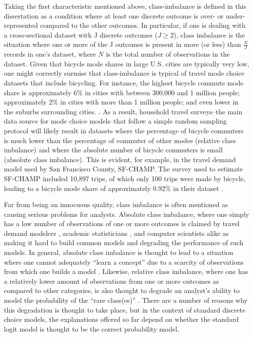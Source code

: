 Taking the first characteristic mentioned above, class-imbalance is defined in this dissertation as a condition where at least one discrete outcome is over- or under-represented compared to the other outcomes. In particular, if one is dealing with a cross-sectional dataset with J discrete outcomes ($J \geq 2$), class imbalance is the situation where one or more of the J outcomes is present in more (or less) than $\frac{N}{J}$  records in one's dataset, where $N$ is the total number of observations in the dataset. Given that bicycle mode shares in large U.S. cities are typically very low, one might correctly surmise that class-imbalance is typical of travel mode choice datasets that include bicycling. For instance, the highest bicycle commute mode share is approximately 6\% in cities with between 300,000 and 1 million people; approximately 2\% in cities with more than 1 million people; and even lower in the suburbs surrounding cities. \citep{league_of_american_bicyclists_where_2014}. As a result, household travel surveys--the main data source for mode choice models--that follow a simple random sampling protocol will likely result in datasets where the percentage of bicycle commuters is much lower than the percentage of commuter of other modes (relative class imbalance) and where the absolute number of bicycle commuters is small (absolute class imbalance). This is evident, for example, in the travel demand model used by San Francisco County, SF-CHAMP. The survey used to estimate SF-CHAMP included 10,897 trips, of which only 100 trips were made by bicycle, leading to a bicycle mode share of approximately 0.92\% in their dataset \citep{cambridge_systematics_san_2002}.

Far from being an innocuous quality, class imbalance is often mentioned as causing serious problems for analysts. Absolute class imbalance, where one simply has a low number of observations of one or more outcomes is claimed by travel demand modelers \citep{parsons_brinckerhoff_quade_&_douglas_transportation_2005}, academic statisticians \citep{chen_using_2004}, and computer scientists \citep{weiss_mining_2004, he_learning_2009} alike as making it hard to build common models and degrading the performance of such models. In general, absolute class imbalance is thought to lead to a situation where one cannot adequately ``learn a concept'' due to a scarcity of observations from which one builds a model \citep{weiss_mining_2004, he_learning_2009}. Likewise, relative class imbalance, where one has a relatively lower amount of observations from one or more outcomes as compared to other categories, is also thought to degrade an analyst's ability to model the probability of the ``rare class(es)'' \citep{cramer_predictive_1999, king_logistic_2001, japkowicz_class_2000, wallace_class_2011}. There are a number of reasons why this degradation is thought to take place, but in the context of standard discrete choice models, the explanations offered so far depend on whether the standard logit model is thought to be the correct probability model.

